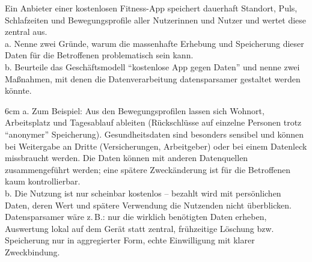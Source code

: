 \question[4]
Ein Anbieter einer kostenlosen Fitness-App speichert dauerhaft Standort, Puls, Schlafzeiten und
Bewegungsprofile aller Nutzerinnen und Nutzer und wertet diese zentral aus. \\
a. Nenne zwei Gründe, warum die massenhafte Erhebung und Speicherung dieser Daten für die
Betroffenen problematisch sein kann. \\
b. Beurteile das Geschäftsmodell \enquote{kostenlose App gegen Daten} und nenne zwei Maßnahmen,
mit denen die Datenverarbeitung datensparsamer gestaltet werden könnte.

\begin{solutionbox}{6cm}
a. Zum Beispiel: Aus den Bewegungsprofilen lassen sich Wohnort, Arbeitsplatz und Tagesablauf
ableiten (Rückschlüsse auf einzelne Personen trotz \enquote{anonymer} Speicherung). Gesundheitsdaten
sind besonders sensibel und können bei Weitergabe an Dritte (Versicherungen, Arbeitgeber) oder bei
einem Datenleck missbraucht werden. Die Daten können mit anderen Datenquellen zusammengeführt
werden; eine spätere Zweckänderung ist für die Betroffenen kaum kontrollierbar. \\
b. Die Nutzung ist nur scheinbar kostenlos -- bezahlt wird mit persönlichen Daten, deren Wert und
spätere Verwendung die Nutzenden nicht überblicken. Datensparsamer wäre z.\,B.: nur die wirklich
benötigten Daten erheben, Auswertung lokal auf dem Gerät statt zentral, frühzeitige Löschung bzw.
Speicherung nur in aggregierter Form, echte Einwilligung mit klarer Zweckbindung.
\end{solutionbox}
